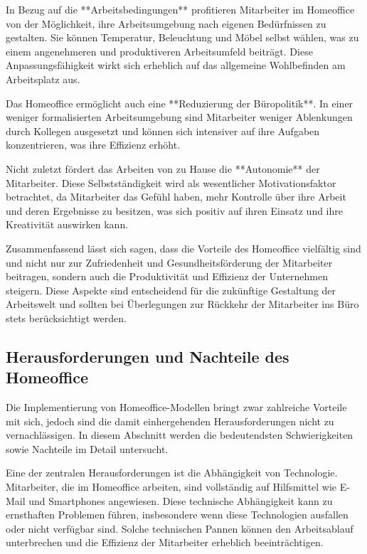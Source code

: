 In Bezug auf die **Arbeitsbedingungen** profitieren Mitarbeiter im Homeoffice von der Möglichkeit, ihre Arbeitsumgebung nach eigenen Bedürfnissen zu gestalten. Sie können Temperatur, Beleuchtung und Möbel selbst wählen, was zu einem angenehmeren und produktiveren Arbeitsumfeld beiträgt\cite{file4}. Diese Anpassungsfähigkeit wirkt sich erheblich auf das allgemeine Wohlbefinden am Arbeitsplatz aus.

Das Homeoffice ermöglicht auch eine **Reduzierung der Büropolitik**. In einer weniger formalisierten Arbeitsumgebung sind Mitarbeiter weniger Ablenkungen durch Kollegen ausgesetzt und können sich intensiver auf ihre Aufgaben konzentrieren, was ihre Effizienz erhöht\cite{file4}.

Nicht zuletzt fördert das Arbeiten von zu Hause die **Autonomie** der Mitarbeiter. Diese Selbstständigkeit wird als wesentlicher Motivationsfaktor betrachtet, da Mitarbeiter das Gefühl haben, mehr Kontrolle über ihre Arbeit und deren Ergebnisse zu besitzen, was sich positiv auf ihren Einsatz und ihre Kreativität auswirken kann\cite{file4}.

Zusammenfassend lässt sich sagen, dass die Vorteile des Homeoffice vielfältig sind und nicht nur zur Zufriedenheit und Gesundheitsförderung der Mitarbeiter beitragen, sondern auch die Produktivität und Effizienz der Unternehmen steigern. Diese Aspekte sind entscheidend für die zukünftige Gestaltung der Arbeitswelt und sollten bei Überlegungen zur Rückkehr der Mitarbeiter ins Büro stets berücksichtigt werden.

\subsection{Herausforderungen und Nachteile des Homeoffice}
Die Implementierung von Homeoffice-Modellen bringt zwar zahlreiche Vorteile mit sich, jedoch sind die damit einhergehenden Herausforderungen nicht zu vernachlässigen. In diesem Abschnitt werden die bedeutendsten Schwierigkeiten sowie Nachteile im Detail untersucht.

Eine der zentralen Herausforderungen ist die Abhängigkeit von Technologie. Mitarbeiter, die im Homeoffice arbeiten, sind vollständig auf Hilfsmittel wie E-Mail und Smartphones angewiesen. Diese technische Abhängigkeit kann zu ernsthaften Problemen führen, insbesondere wenn diese Technologien ausfallen oder nicht verfügbar sind. Solche technischen Pannen können den Arbeitsablauf unterbrechen und die Effizienz der Mitarbeiter erheblich beeinträchtigen\cite{file4}.

